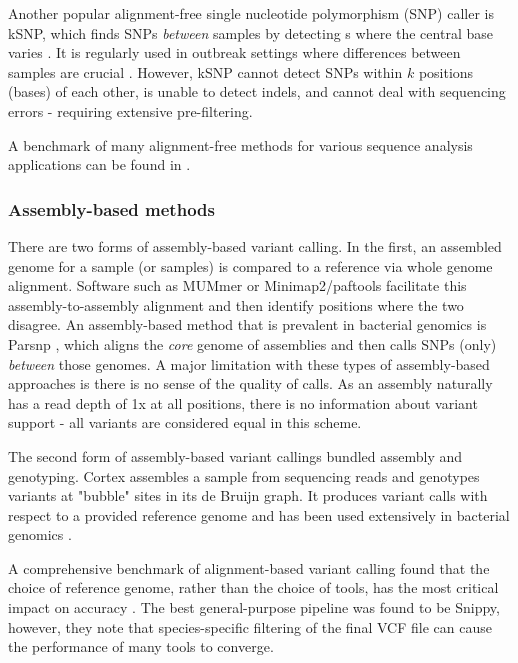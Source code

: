 Another popular alignment-free single nucleotide polymorphism (SNP) caller is kSNP, which finds SNPs \emph{between} samples by detecting \kmer{}s where the central base varies \cite{ksnp2015}. It is regularly used in outbreak settings where differences between samples are crucial \cite{Bazan2017,Raphael2016,Chochua2017}. However, kSNP cannot detect SNPs within $k$ positions (bases) of each other, is unable to detect indels, and cannot deal with sequencing errors - requiring extensive pre-filtering.

A benchmark of many alignment-free methods for various sequence analysis applications can be found in \cite{Zielezinski2019}. 

\subsubsection{Assembly-based methods}

There are two forms of assembly-based variant calling. In the first, an assembled genome for a sample (or samples) is compared to a reference via whole genome alignment. Software such as MUMmer \cite{mummer2018} or Minimap2/paftools \cite{li2018} facilitate this assembly-to-assembly alignment and then identify positions where the two disagree. An assembly-based method that is prevalent in bacterial genomics is Parsnp \cite{Treangen2014}, which aligns the \emph{core} genome of assemblies and then calls SNPs (only) \emph{between} those genomes. A major limitation with these types of assembly-based approaches is there is no sense of the quality of calls. As an assembly naturally has a read depth of 1x at all positions, there is no information about variant support - all variants are considered equal in this scheme.

The second form of assembly-based variant callings bundled assembly and genotyping. Cortex \cite{iqbal2012} \denovo{} assembles a sample from sequencing reads and genotypes variants at "bubble" sites in its de Bruijn graph. It produces variant calls with respect to a provided reference genome and has been used extensively in bacterial genomics \cite{bradley2015,hunt2019,Stasiewicz2015,Young2017,Lees2017}.

\hspace{0.75cm}

\noindent
A comprehensive benchmark of alignment-based variant calling found that the choice of reference genome, rather than the choice of tools, has the most critical impact on accuracy \cite{Bush2020}. The best general-purpose pipeline was found to be Snippy, however, they note that species-specific filtering of the final VCF file can cause the performance of many tools to converge.

